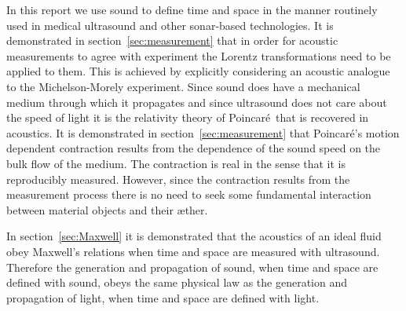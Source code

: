 \documentclass[10pt, fleqn,final,showtrims,oldfontcommands, article,a4paper,oneside]{memoir} %
\newcommand{\secref}[1]{section~\ref{sec:#1}}
\newcommand{\aether}{\ae ther}
\newcommand{\Poincare}{Poincar{\'e}}
\begin{document}






In this report we use sound to define time and space 
in the manner  routinely used in medical ultrasound and other sonar-based technologies.
It is demonstrated in section~\ref{sec:measurement} that in order for acoustic measurements 
to agree with experiment the Lorentz transformations need to be applied to them.
This is achieved by explicitly considering an acoustic analogue to the Michelson-Morely experiment.
Since sound  does have a mechanical medium through which it propagates and since ultrasound does not care about the speed of light
it is the relativity theory of \Poincare\ that is recovered in acoustics.
It is demonstrated in  \secref{measurement} that \Poincare's motion dependent contraction 
results from the dependence of the  sound speed on the bulk flow of the medium.
The contraction is real in the sense that it is reproducibly measured.
However, since the contraction results from the measurement process there is 
no need to seek some fundamental interaction between material objects and their \aether.

In section~\ref{sec:Maxwell} it is demonstrated that the acoustics of an ideal fluid obey Maxwell's relations when time and space are measured with ultrasound.
Therefore the generation and propagation of sound,  when time and space are defined with  sound,
obeys the same physical law as the generation and propagation of light,  when time and space are defined with light.
\end{document}

